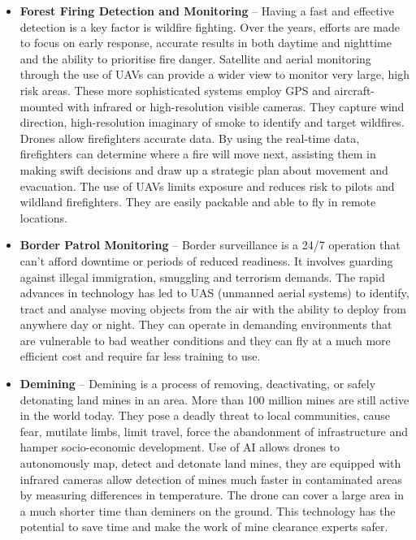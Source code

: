 \begin{itemize}
    \item \textbf{Forest Firing Detection and Monitoring} -- Having a fast and effective detection is a key factor is wildfire fighting. Over the years, efforts are made to focus on early response, accurate results in both daytime and nighttime and the ability to prioritise fire danger.
    Satellite and aerial monitoring through the use of UAVs can provide a wider view to monitor very large, high risk areas. These more sophisticated systems employ GPS and aircraft-mounted with infrared or high-resolution visible cameras. They capture wind direction, high-resolution imaginary of smoke to identify and target wildfires.
    Drones allow firefighters accurate data. By using the real-time data, firefighters can determine where a fire will move next, assisting them in making swift decisions and draw up a strategic plan about movement and evacuation.
    The use of UAVs limits exposure and reduces risk to pilots and wildland firefighters. They are easily packable and able to fly in remote locations. 

    \item \textbf{Border Patrol Monitoring} -- Border surveillance is a 24/7 operation that can't afford downtime or periods of reduced readiness. It involves guarding against illegal immigration, smuggling and terrorism demands.
    The rapid advances in technology has led to UAS (unmanned aerial systems) to identify, tract and analyse moving objects from the air with the ability to deploy from anywhere day or night. They can operate in demanding environments that are vulnerable to bad weather conditions and they can fly at a much more efficient cost and require far less training to use.

    \item \textbf{Demining} -- Demining is a process of removing, deactivating, or safely detonating land mines in an area.
    More than 100 million mines are still active in the world today. They pose a deadly threat to local communities, cause fear, mutilate limbs, limit travel, force the abandonment of infrastructure and hamper socio-economic development.
    Use of AI allows drones to autonomously map, detect and detonate land mines, they are equipped with infrared cameras allow detection of mines much faster in contaminated areas by measuring differences in temperature. The drone can cover a large area in a much shorter time than deminers on the ground. This technology has the potential to save time and make the work of mine clearance experts safer.
    

\end{itemize}
